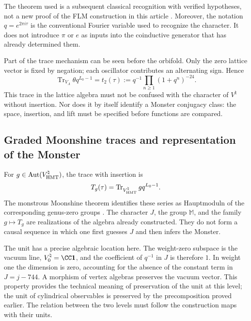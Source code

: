 The theorem used is a subsequent classical recognition with verified
hypotheses, not a new proof of the FLM construction in this article
\cite{flm}.
Moreover, the notation $q=e^{2\pi i\tau}$ is the conventional Fourier
variable used to recognize the character. It does not introduce $\pi$
or $e$ as inputs into the coinductive generator that has already determined them.

Part of the trace mechanism can be seen before the orbifold.
Only the zero lattice vector is fixed by negation; each
oscillator contributes an alternating sign. Hence
\[
 \operatorname{Tr}_{V_\Lambda}\theta q^{L_0-1}
   =t_2(\tau)
   :=q^{-1}\prod_{n\geq1}(1+q^n)^{-24}.
\]
This trace in the lattice algebra must not be confused with the
character of $V^\natural$ without insertion. Nor does it by
itself identify a Monster conjugacy class: the space, insertion,
and lift must be specified before functions are compared.








\subsection{Graded Moonshine traces and representation of the Monster}
\label{exc:alcance}

For $g\in\operatorname{Aut}(V^\natural_{\rm HMT})$, the trace
with insertion is
\[
 T_g(\tau)=
 \operatorname{Tr}_{V^\natural_{\rm HMT}}gq^{L_0-1}.
\]
The monstrous Moonshine theorem identifies these series as
Hauptmoduln of the corresponding genus-zero groups
\cite[Theorem~1.1]{borcherds}.
The character $J$, the group $\mathbb M$, and the family $g\mapsto T_g$
are realizations of the algebra already constructed. They do not form a causal
sequence in which one first guesses $J$ and then infers the Monster.

The unit has a precise algebraic location here. The weight-zero
subspace is the vacuum line, \(V^\natural_0=\CC\mathbf1\), and
the coefficient of \(q^{-1}\) in \(J\) is therefore \(1\). In weight one
the dimension is zero, accounting for the absence of the constant term
in \(J=j-744\). A morphism of vertex algebras preserves the vacuum
vector. This property provides the technical meaning of preservation
of the unit at this level; the unit of cylindrical observables
is preserved by the precomposition proved earlier. The relation
between the two levels must follow the construction maps with their units.

